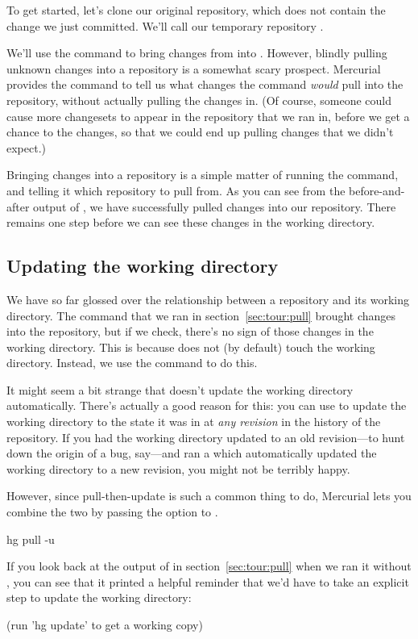 To get started, let's clone our original  repository,
which does not contain the change we just committed.  We'll call our
temporary repository .

We'll use the  command to bring changes from
 into .  However, blindly
pulling unknown changes into a repository is a somewhat scary
prospect.  Mercurial provides the  command to tell us
what changes the  command \emph{would} pull into the
repository, without actually pulling the changes in.
(Of course, someone could cause more changesets to appear in the
repository that we ran  in, before we get a chance to
 the changes, so that we could end up pulling changes that we
didn't expect.)

Bringing changes into a repository is a simple matter of running the
 command, and telling it which repository to pull from.
As you can see from the before-and-after output of , we
have successfully pulled changes into our repository.  There remains
one step before we can see these changes in the working directory.

\subsection{Updating the working directory}

We have so far glossed over the relationship between a repository and
its working directory.  The  command that we ran in
section~\ref{sec:tour:pull} brought changes into the repository, but
if we check, there's no sign of those changes in the working
directory.  This is because  does not (by default) touch
the working directory.  Instead, we use the  command to
do this.

It might seem a bit strange that  doesn't update the
working directory automatically.  There's actually a good reason for
this: you can use  to update the working directory to
the state it was in at \emph{any revision} in the history of the
repository.  If you had the working directory updated to an old
revision---to hunt down the origin of a bug, say---and ran a
 which automatically updated the working directory to a
new revision, you might not be terribly happy.

However, since pull-then-update is such a common thing to do,
Mercurial lets you combine the two by passing the 
option to .
\begin{codesample2}
  hg pull -u
\end{codesample2}
If you look back at the output of  in
section~\ref{sec:tour:pull} when we ran it without ,
you can see that it printed a helpful reminder that we'd have to take
an explicit step to update the working directory:
\begin{codesample2}
  (run 'hg update' to get a working copy)
\end{codesample2}

